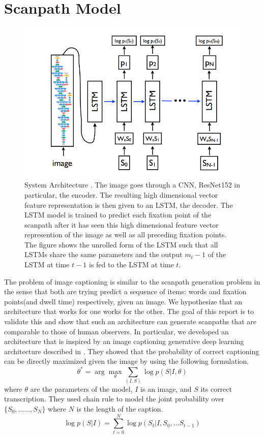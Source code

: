 \documentclass{article} %
\begin{document}
\section{Scanpath Model}
\begin{figure}[h]
    \centering
    \includegraphics[scale=0.5]{captioning.png}
    \caption{System Architecture \cite{DBLP:journals/corr/VinyalsTBE14}. The image goes through a CNN, ResNet152 in particular, the encoder. The resulting high dimensional vector feature representation is then given to an LSTM, the decoder. The LSTM model is trained to predict each fixation point of the scanpath after it has seen this high dimensional feature vector represention of the image as well as all preceding fixation points. The figure shows the unrolled form of the LSTM  such that all LSTMs share the same parameters and the output $m_t-1$ of the LSTM at time $t-1$ is fed to the LSTM at time $t$.   }
    \label{fig:arch}
\end{figure}
The problem of image captioning is similar to the scanpath generation problem in the sense that both are trying predict a sequence of items: words and fixation points(and dwell time) respectively, given an image. We hypothesize that an architecture that works for one works for the other. The goal of this report is to validate this and show that such an architecture can generate scanpaths that are comparable to those of  human observers. In particular, we developed an architecture that is inspired by an image captioning generative deep learning architecture described in \cite{DBLP:journals/corr/VinyalsTBE14}. %
They showed that the probability of correct captioning can be directly maximized given the image by using the following formulation.
\begin{equation}
    \theta^{*} = \arg\max_{\theta}\sum_{(I, S)} \log p(S|I,\theta) 
\end{equation}
where $\theta$ are the parameters of the model, $I$ is an image, and $S$ its correct transcription.
They used chain rule to model the joint probability over $\{S_0, \dots \dots, S_N\}$ where $N$ is the length of the caption. 
\begin{equation}
    \log p(S|I) = \sum_{t=0}^{N}\log p(S_t|I, S_{0}, \dots S_{t-1})
\end{equation}
\end{document}
